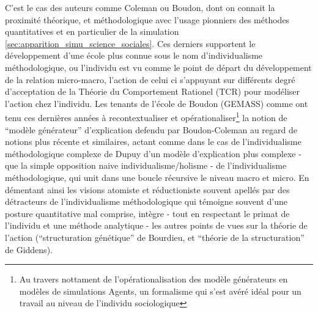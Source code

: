 
C'est le cas des auteurs comme Coleman ou Boudon, dont on connait la proximité théorique, et méthodologique avec l'usage pionniers des méthodes quantitatives et en particulier de la simulation \ref{sec:apparition_simu_science_sociales}. Ces derniers supportent le développement d'une école plus connue sous le nom d'individualisme méthodologique, ou l'individu est vu comme le point de départ du développement de la relation micro-macro, l'action de celui ci s'appuyant sur différents degré d'acceptation de la Théorie du Comportement Rationel (TCR) pour modéliser l'action chez l'individu. Les tenants de l'école de Boudon (GEMASS) comme \textcite{Manzo2007, Manzo2005} ont tenu ces dernières années à recontextualiser et opérationaliser\footnote{Au travers nottament de l'opérationalisation des modèle générateurs en modèles de simulations Agents, un formalisme qui s'est avéré idéal pour un travail au niveau de l'individu sociologique} la notion de \enquote{modèle générateur}  d'explication defendu par Boudon-Coleman au regard de notions plus récente et similaires, actant comme dans le cas de l'individualisme méthodologique complexe de Dupuy d'un modèle d'explication plus complexe  - que la simple opposition naive individualisme/holisme - de l'individualisme méthodologique, qui unit dans une boucle récursive le niveau macro et micro. En démentant ainsi les visions atomiste et réductioniste souvent apellés par des détracteurs de l'individualisme méthodologique qui témoigne souvent d'une posture quantitative mal comprise, \textcite{Manzo2007} intègre - tout en respectant le primat de l'individu et une méthode analytique - les autres points de vues sur la théorie de l'action (\enquote{structuration génétique} de Bourdieu, et \enquote{théorie de la structuration} de Giddens).

